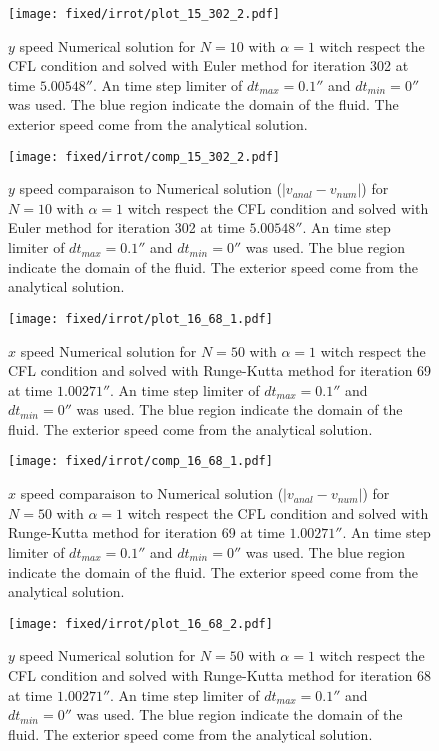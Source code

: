 \begin{figure}
\texttt{[image: fixed/irrot/plot\_15\_302\_2.pdf]}
\caption{$y$ speed Numerical solution for $N=10$ with $\alpha=1$ witch respect the CFL condition and solved with Euler method
for iteration 302 at time $\unit{5.00548}{\second}$.
An time step limiter of $dt_{max}=\unit{0.1}{\second}$ and $dt_{min}=\unit{0}{\second}$ was used.
The blue region indicate the domain of the fluid. The exterior speed come from the analytical solution.
\label{fix:plot_15_302_2}
}
\end{figure}

\begin{figure}
\texttt{[image: fixed/irrot/comp\_15\_302\_2.pdf]}
\caption{$y$ speed comparaison to Numerical solution ($|v_{anal}-v_{num}|$) for $N=10$ with $\alpha=1$ witch respect the CFL condition and solved with Euler method
for iteration 302 at time $\unit{5.00548}{\second}$.
An time step limiter of $dt_{max}=\unit{0.1}{\second}$ and $dt_{min}=\unit{0}{\second}$ was used.
The blue region indicate the domain of the fluid. The exterior speed come from the analytical solution.
\label{fix:comp_15_302_2}
}
\end{figure}

\begin{figure}
\texttt{[image: fixed/irrot/plot\_16\_68\_1.pdf]}
\caption{$x$ speed Numerical solution for $N=50$ with $\alpha=1$ witch respect the CFL condition and solved with Runge-Kutta method
for iteration 69 at time $\unit{1.00271}{\second}$.
An time step limiter of $dt_{max}=\unit{0.1}{\second}$ and $dt_{min}=\unit{0}{\second}$ was used.
The blue region indicate the domain of the fluid. The exterior speed come from the analytical solution.
\label{fix:plot_16_68_1}
}
\end{figure}

\begin{figure}
\texttt{[image: fixed/irrot/comp\_16\_68\_1.pdf]}
\caption{$x$ speed comparaison to Numerical solution ($|v_{anal}-v_{num}|$) for $N=50$ with $\alpha=1$ witch respect the CFL condition and solved with Runge-Kutta method
for iteration 69 at time $\unit{1.00271}{\second}$.
An time step limiter of $dt_{max}=\unit{0.1}{\second}$ and $dt_{min}=\unit{0}{\second}$ was used.
The blue region indicate the domain of the fluid. The exterior speed come from the analytical solution.
\label{fix:comp_16_68_1}
}
\end{figure}

\begin{figure}
\texttt{[image: fixed/irrot/plot\_16\_68\_2.pdf]}
\caption{$y$ speed Numerical solution for $N=50$ with $\alpha=1$ witch respect the CFL condition and solved with Runge-Kutta method
for iteration 68 at time $\unit{1.00271}{\second}$.
An time step limiter of $dt_{max}=\unit{0.1}{\second}$ and $dt_{min}=\unit{0}{\second}$ was used.
The blue region indicate the domain of the fluid. The exterior speed come from the analytical solution.
\label{fix:plot_16_68_2}
}
\end{figure}

